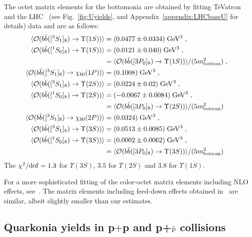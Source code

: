 \documentclass[article,showpacs,preprintnumbers,amsmath,amssymb]{revtex4}
\newcommand{\barb}{{\bar{b}}}
\newcommand{\calO}{{\cal{O}}}
\newcommand{\bottom}{{\rm{bottom}}}
\begin{document}
The octet matrix elements for the bottomonia are obtained by fitting
TeVatron~\cite{Acosta:2001gv} and the LHC~\cite{Khachatryan:2010zg} (see
Fig.~\ref{fig:Uyields}, and Appendix~\ref{appendix:LHCbaseU} for details) data
and are as follows:
\begin{equation}
\begin{split}
\langle \calO(b\barb([^3S_1]_{8})\rightarrow \Upsilon(1S))\rangle
&=(0.0477\pm0.0334)\;{\rm GeV^3} \;,\\
\langle \calO(b\barb([^1S_0]_{8})\rightarrow \Upsilon(1S))\rangle
&=(0.0121\pm0.040)\;{\rm GeV^3}\;, \\
&=\langle \calO(b\barb([3P_0]_{8})\rightarrow \Upsilon(1S))\rangle
/(5m_{\bottom}^2) \;, \\
\langle \calO(b\barb([^3S_1]_{8})\rightarrow \chi_{b0}(1P))\rangle
&=(0.1008)\;{\rm GeV^3}\;, \\
\langle \calO(b\barb([^3S_1]_{8})\rightarrow \Upsilon(2S))\rangle
&=(0.0224\pm0.02)\;{\rm GeV^3}\;, \\
\langle \calO(b\barb([^1S_0]_{8})\rightarrow \Upsilon(2S))\rangle
&=(-0.0067\pm0.0084)\;{\rm GeV^3}\;, \\
&=\langle \calO(b\barb([3P_0]_{8})\rightarrow \Upsilon(2S))\rangle
/(5m_{\bottom}^2)\\
\langle \calO(b\barb([^3S_1]_{8})\rightarrow \chi_{b0}(2P))\rangle
&=(0.0324)\;{\rm GeV^3}\; ,\\
\langle \calO(b\barb([^3S_1]_{8})\rightarrow \Upsilon(3S))\rangle
&=(0.0513\pm0.0085)\;{\rm GeV^3}\;, \\
\langle \calO(b\barb([^1S_0]_{8})\rightarrow \Upsilon(3S))\rangle
&=(0.0002\pm0.0062)\;{\rm GeV^3}\;, \\
&=\langle \calO(b\barb([3P_0]_{8})\rightarrow \Upsilon(3S))\rangle
/(5m_{\bottom}^2)
\label{eq:bottomoctet}
\end{split}
\end{equation}
The $\chi^2/{\rm{dof}}=1.3$ for $\Upsilon(3S)$, $3.5$ for $\Upsilon(2S)$ and
$3.8$ for $\Upsilon(1S)$.

For a more sophisticated fitting of the color-octet matrix elements including
NLO effects, see~\cite{Butenschoen:2010rq, Butenschoen:Long,
Butenschoen:polarised}. The matrix elements including feed-down effects
obtained in~\cite{Butenschoen:polarised} are similar, albeit slightly smaller
than our estimates.

\subsection{Quarkonia yields in p$+$p and p+${\bar{\rm p}}$ 
collisions~\label{section:ppyields}}
\end{document}
